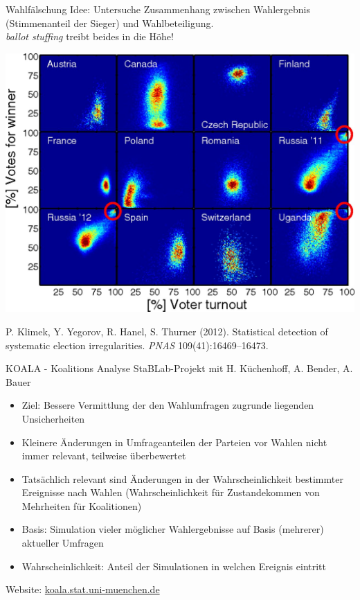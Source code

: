 \documentclass[
  10pt,
  ignorenonframetext,
]{beamer}
\providecommand{\tightlist}{%
  \setlength{\itemsep}{0pt}\setlength{\parskip}{0pt}}
\begin{document}
\begin{frame}{Wahlfälschung}
\label{wahlfuxe4lschung}
Idee: Untersuche Zusammenhang zwischen Wahlergebnis (Stimmenanteil der
Sieger) und Wahlbeteiligung.\\
\emph{ballot stuffing} treibt beides in die Höhe!

\begin{center}
  \includegraphics[width=.7\textwidth]{pics/0-ex2-electionfraud.jpg}
\end{center}
\scriptsize
\vspace{-.5em}

P. Klimek, Y. Yegorov, R. Hanel, S. Thurner (2012). Statistical
detection of systematic election irregularities. \emph{PNAS}
109(41):16469--16473.
\end{frame}

\begin{frame}{KOALA - Koalitions Analyse}
\label{koala---koalitions-analyse}
StaBLab-Projekt mit H. Küchenhoff, A. Bender, A. Bauer

\begin{itemize}
\tightlist
\item
  Ziel: Bessere Vermittlung der den Wahlumfragen zugrunde liegenden
  Unsicherheiten
\item
  Kleinere Änderungen in Umfrageanteilen der Parteien vor Wahlen nicht
  immer relevant, teilweise überbewertet
\item
  Tatsächlich relevant sind Änderungen in der Wahrscheinlichkeit
  bestimmter Ereignisse nach Wahlen (Wahrscheinlichkeit für
  Zustandekommen von Mehrheiten für Koalitionen)
\item
  Basis: Simulation vieler möglicher Wahlergebnisse auf Basis (mehrerer)
  aktueller Umfragen
\item
  Wahrscheinlichkeit: Anteil der Simulationen in welchen Ereignis
  eintritt
\end{itemize}

\vspace{.5cm}

Website:
\href{https://koala.stat.uni-muenchen.de/}{koala.stat.uni-muenchen.de}
\end{frame}
\end{document}
